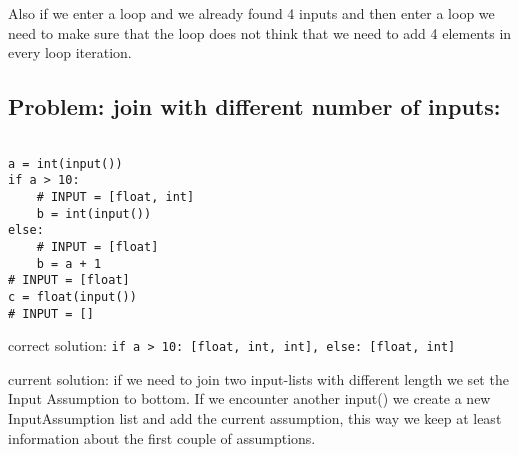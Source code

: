 \documentclass[11pt]{article}
\begin{document}
Also if we enter a loop and we already found 4 inputs and then enter a loop we need to make sure that the loop does not think that we need to add 4 elements in every loop iteration.

\subsection{Problem: join with different number of inputs:}

\begin{lstlisting}[numbers=none]

a = int(input())
if a > 10:
    # INPUT = [float, int]
    b = int(input())
else:
    # INPUT = [float]
    b = a + 1
# INPUT = [float]
c = float(input())
# INPUT = []
\end{lstlisting}

correct solution: \verb|if a > 10: [float, int, int], else: [float, int]|

current solution: if we need to join two input-lists with different length we set the Input Assumption to bottom. If we encounter another input() we create a new InputAssumption list and add the current assumption, this way we keep at least information about the first couple of assumptions.
\end{document}
